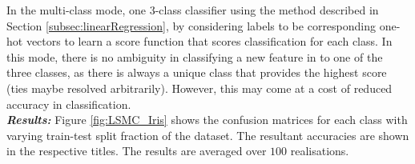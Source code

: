 \documentclass[12pt, a4 paper]{article}
\begin{document}
\label{prob:2.ii}

In the multi-class mode, one $3$-class classifier using the method described in Section \ref{subsec:linearRegression}, by considering labels to be corresponding one-hot vectors to learn a score function that scores classification for each class. In this mode, there is no ambiguity in classifying a new feature in to one of the three classes, as there is always a unique class that provides the highest score (ties maybe resolved arbitrarily). However, this may come at a cost of reduced accuracy in classification. \\

{\it \bfseries Results:} Figure \ref{fig:LSMC_Iris} shows the confusion matrices for each class with varying train-test split fraction of the dataset. The resultant accuracies are shown in the respective titles. The results are averaged over $100$ realisations. \\
\end{document}
